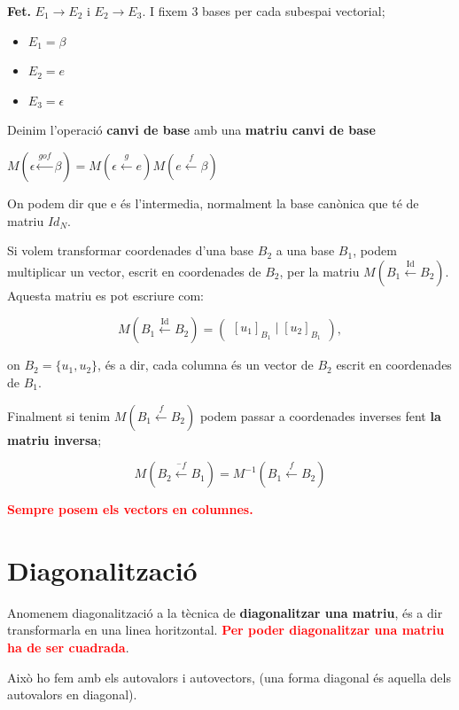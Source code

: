 \documentclass[12pt]{article}
\begin{document}
\textbf{Fet.} $E_1 \rightarrow E_2$ i $E_2 \rightarrow E_3$. I fixem 3 bases per cada subespai vectorial;

\begin{itemize}
    \item $E_1 = \beta$
    \item $E_2 = e$
    \item $E_3 = \epsilon$
\end{itemize}

Deinim l'operació \textbf{canvi de base} amb una \textbf{matriu canvi de base} 

$M(\epsilon \xleftarrow{{gof}} \beta ) = M(\epsilon \xleftarrow{{g}} e )M(e \xleftarrow{{f}} \beta )$

On podem dir que e és l'intermedia, normalment la base canònica que té de matriu $Id_N$.

\begin{examplebox}{}
    Si volem transformar coordenades d'una base $B_2$ a una base $B_1$, podem multiplicar un vector, escrit en coordenades de $B_2$, per la matriu $M(B_1 \xleftarrow{\mathrm{Id}} B_2)$. Aquesta matriu es pot escriure com:

    \[M(B_1 \xleftarrow{\mathrm{Id}} B_2) = \begin{pmatrix}
        [u_1]_{B_1} \mid [u_2]_{B_1}
    \end{pmatrix},\]

    on $B_2=\{u_1,u_2\}$, és a dir, cada columna és un vector de $B_2$ escrit en coordenades de $B_1$.
\end{examplebox}

Finalment si tenim $M(B_1 \xleftarrow{f} B_2)$ podem passar a coordenades inverses fent \textbf{la matriu inversa};

\[M(B_2 \xleftarrow{^-f} B_1) = M^{-1}(B_1 \xleftarrow{f} B_2)\]

\textcolor{red}{\textbf{Sempre posem els vectors en columnes.}}

\section{Diagonalització}

Anomenem diagonalització a la tècnica de \textbf{diagonalitzar una matriu}, és a dir transformarla en una linea horitzontal. \textcolor{red}{\textbf{Per poder diagonalitzar una matriu ha de ser cuadrada}}.

Això ho fem amb els autovalors i autovectors, (una forma diagonal és aquella dels autovalors en diagonal).
\end{document}
